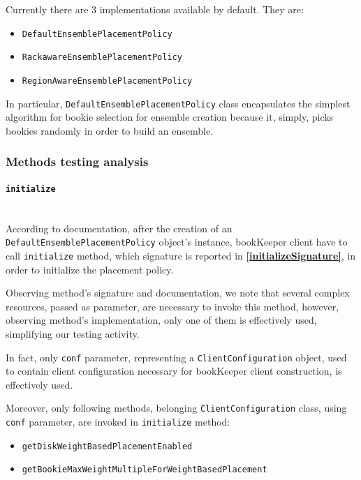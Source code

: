 \documentclass[sigconf]{acmart}
\begin{document}
Currently there are 3 implementations available by default. They are:
\begin{itemize}
\item \texttt{DefaultEnsemblePlacementPolicy}
\item \texttt{RackawareEnsemblePlacementPolicy}
\item \texttt{RegionAwareEnsemblePlacementPolicy}
\end{itemize}

In particular, \texttt{DefaultEnsemblePlacementPolicy} class encapsulates the simplest algorithm for bookie selection for ensemble creation because it, simply, picks bookies randomly in order to build an ensemble. 

\subsubsection{Methods testing analysis}

\paragraph{\texttt{initialize}}
\hfill\\
According to documentation, after the creation of an \texttt{Default\-EnsemblePlacementPolicy} object's instance, bookKeeper client have to call \texttt{initialize} method, which signature is reported in \textbf{\cref{initializeSignature}}, in order to initialize the placement policy. 

Observing method's signature and documentation, we note that several complex resources, passed as parameter, are necessary to invoke this method, however, observing method's implementation, only one of them is effectively used, simplifying our testing activity.

In fact, only \texttt{conf} parameter, representing a \texttt{Client\-Configu\-ration} object, used to contain client configuration necessary for bookKeeper client construction, is effectively used. 

Moreover, only following methods, belonging \texttt{Client\-Configu\-ration} class, using \texttt{conf} parameter, are invoked in \texttt{initialize} method:

\begin{itemize}
\item \texttt{getDiskWeightBasedPlacementEnabled}
\item \texttt{getBookieMaxWeightMultipleForWeightBasedPlacement}
\end{itemize}
\end{document}
